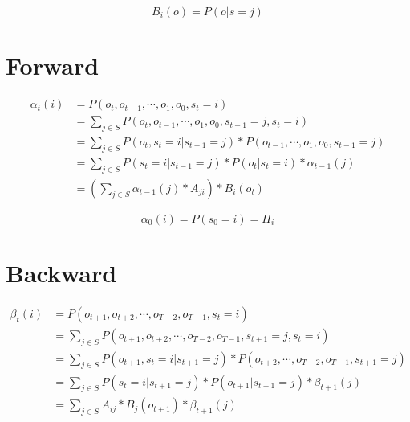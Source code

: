 \documentclass[a4paper,12pt]{article}
\begin{document}
            \begin{equation}
                B_i(o)=P(o|s=j)
            \end{equation}
    
    \section{Forward}

        \begin{equation}
            \begin{split}
                \alpha_t(i)&=P(o_t,o_{t-1},\cdots,o_1,o_0,s_t=i)\\
                &=\sum_{j\in S} P(o_t,o_{t-1},\cdots,o_1,o_0,s_{t-1}=j,s_t=i)\\
                &=\sum_{j\in S} P(o_t,s_t=i|s_{t-1}=j)*P(o_{t-1},\cdots,o_1,o_0,s_{t-1}=j)\\
                &=\sum_{j\in S} P(s_t=i|s_{t-1}=j)*P(o_t|s_t=i)*\alpha_{t-1}(j)\\
                &=\left(\sum_{j\in S} \alpha_{t-1}(j)*A_{ji}\right)*B_i(o_t)
            \end{split}
        \end{equation}

        \begin{equation}
            \alpha_0(i)=P(s_0=i)=\Pi_i
        \end{equation}

    \section{Backward}

        \begin{equation}
            \begin{split}
                \beta_t(i)&=P(o_{t+1},o_{t+2},\cdots,o_{T-2},o_{T-1},s_t=i)\\
                &=\sum_{j\in S} P(o_{t+1},o_{t+2},\cdots,o_{T-2},o_{T-1},s_{t+1}=j,s_t=i)\\
                &=\sum_{j\in S} P(o_{t+1},s_t=i|s_{t+1}=j)*P(o_{t+2},\cdots,o_{T-2},o_{T-1},s_{t+1}=j)\\
                &=\sum_{j\in S} P(s_t=i|s_{t+1}=j)*P(o_{t+1}|s_{t+1}=j)*\beta_{t+1}(j)\\
                &=\sum_{j\in S} A_{ij}*B_{j}(o_{t+1})*\beta_{t+1}(j)
            \end{split}
        \end{equation}
\end{document}
